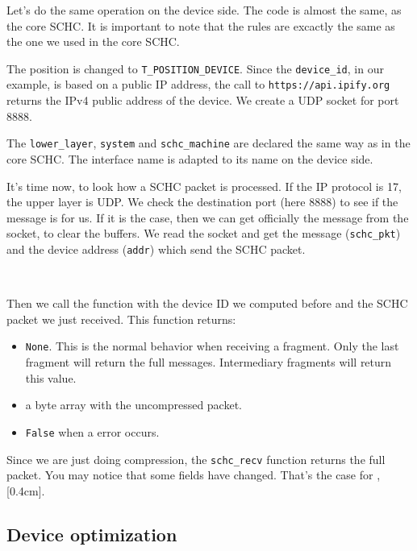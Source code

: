 Let's do the same operation on the device side. The code is almost the same, as the core SCHC. It is important to note that the rules are excactly the same as the one we used in the core SCHC.


The position is changed to \texttt{T\_POSITION\_DEVICE}.  Since the \texttt{device\_id}, in our example, is based on a public IP address, the call to \texttt{https://api.ipify.org} returns the IPv4 public address of the device. We create a UDP socket for port 8888.



The \texttt{lower\_layer}, \texttt{system} and \texttt{schc\_machine} are declared the same way as in the core SCHC.  The interface name is adapted to its name on the device side.



It's time now, to look how a SCHC packet is processed. If the IP protocol is 17, the upper layer is UDP. We check the destination port (here 8888) to see if the message is for us. If it is the case, then we can get officially the message from the socket, to clear the buffers. We read the socket and get the message (\texttt{schc\_pkt}) and the device address (\texttt{addr}) which send the SCHC packet. 

~~

Then we call the function  with the device ID we computed before and the SCHC packet we just received. This function  returns:
\begin{itemize}
    \item \texttt{None}. This is the normal behavior when receiving a fragment. Only the last fragment will return the full messages. Intermediary fragments will return this value.
    \item a byte array with the uncompressed packet.
    \item \texttt{False} when a error occurs.
\end{itemize}

Since we are just doing compression, the \texttt{schc\_recv} function returns the full packet. You may notice that some fields have changed. That's the case for , [0.4cm]. 



\subsection{Device optimization}

